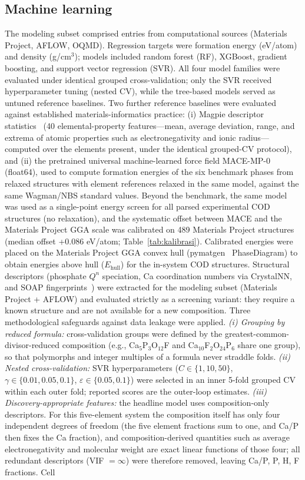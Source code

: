 \documentclass[11pt,a4paper]{article}
\begin{document}
\subsection{Machine learning}
The modeling subset comprised entries from computational sources (Materials Project, AFLOW, OQMD). Regression targets were formation energy (eV/atom) and density (g/cm$^3$); models included random forest (RF), XGBoost, gradient boosting, and support vector regression (SVR). All four model families were evaluated under identical grouped cross-validation; only the SVR received hyperparameter tuning (nested CV), while the tree-based models served as untuned reference baselines. Two further reference baselines were evaluated against established materials-informatics practice: (i) Magpie descriptor statistics~\cite{ward2016} (40 elemental-property features---mean, average deviation, range, and extrema of atomic properties such as electronegativity and ionic radius---computed over the elements present, under the identical grouped-CV protocol), and (ii) the pretrained universal machine-learned force field MACE-MP-0~\cite{batatia2022} (float64), used to compute formation energies of the six benchmark phases from relaxed structures with element references relaxed in the same model, against the same Wagman/NBS standard values. Beyond the benchmark, the same model was used as a single-point energy screen for all parsed experimental COD structures (no relaxation), and the systematic offset between MACE and the Materials Project GGA scale was calibrated on 489 Materials Project structures (median offset +0.086 eV/atom; Table~\ref{tab:kalibrasi}). Calibrated energies were placed on the Materials Project GGA convex hull (pymatgen~\cite{ong2013} PhaseDiagram) to obtain energies above hull ($E_\mathrm{hull}$) for the in-system COD structures. Structural descriptors (phosphate $Q^n$ speciation, Ca coordination numbers via CrystalNN, and SOAP fingerprints~\cite{himanen2020}) were extracted for the modeling subset (Materials Project + AFLOW) and evaluated strictly as a screening variant: they require a known structure and are not available for a new composition. Three methodological safeguards against data leakage were applied. \emph{(i) Grouping by reduced formula:} cross-validation groups were defined by the greatest-common-divisor-reduced composition (e.g., Ca$_5$P$_3$O$_{12}$F and Ca$_{10}$F$_2$O$_{24}$P$_6$ share one group), so that polymorphs and integer multiples of a formula never straddle folds. \emph{(ii) Nested cross-validation:} SVR hyperparameters ($C \in \{1,10,50\}$, $\gamma \in \{0.01,0.05,0.1\}$, $\varepsilon \in \{0.05,0.1\}$) were selected in an inner 5-fold grouped CV within each outer fold; reported scores are the outer-loop estimates. \emph{(iii) Discovery-appropriate features:} the headline model uses composition-only descriptors. For this five-element system the composition itself has only four independent degrees of freedom (the five element fractions sum to one, and Ca/P then fixes the Ca fraction), and composition-derived quantities such as average electronegativity and molecular weight are exact linear functions of those four; all redundant descriptors (VIF $= \infty$) were therefore removed, leaving {Ca/P, P, H, F fractions}. Cell 
\end{document}
